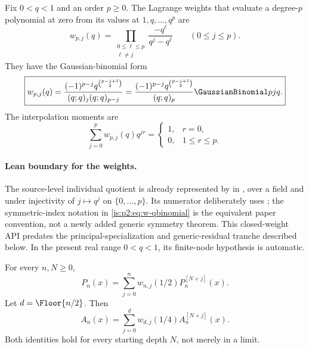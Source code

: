 Fix $0<q<1$ and an order $p\ge0$.  The Lagrange weights that evaluate a degree-$p$ polynomial at
zero from its values at $1,q,\ldots,q^p$ are
\begin{equation}
 w_{p,j}(q)
 =\prod_{\substack{0\le\ell\le p\\\ell\ne j}}
 \frac{-q^\ell}{q^j-q^\ell}
 \qquad(0\le j\le p).
 \label{is:p2:eq:w-Lagrange}
\end{equation}
They have the Gaussian-binomial form
\begin{equation}
 \boxed{
 w_{p,j}(q)
 =\frac{(-1)^{p-j}q^{\binom{p-j+1}{2}}}
 {(q;q)_j(q;q)_{p-j}}
 =\frac{(-1)^{p-j}q^{\binom{p-j+1}{2}}}{(q;q)_p}
 \GaussianBinomial pj q.
 }
 \label{is:p2:eq:w-qbinomial}
\end{equation}
The interpolation moments are
\begin{equation}
 \sum_{j=0}^{p}w_{p,j}(q)q^{jr}
 =\begin{cases}
 1,&r=0,\\
 0,&1\le r\le p.
 \end{cases}
 \label{is:p2:eq:w-annihilation}
\end{equation}

\paragraph{Lean boundary for the weights.}
The source-level individual quotient is already represented by
 in
, over a field and under injectivity of
\(j\mapsto q^j\) on \(\{0,\ldots,p\}\).  Its numerator deliberately uses
; the symmetric-index notation in
\eqref{is:p2:eq:w-qbinomial} is the equivalent paper convention, not a newly added
generic symmetry theorem.  This closed-weight API predates the
principal-specialization and generic-residual tranche described below.  In the
present real range \(0<q<1\), its finite-node hypothesis is automatic.

\begin{theorem}
\label{is:p2:thm:exact-recovery}
For every $n,N\ge0$,
\begin{equation}
 \boxed{
 P_n(x)=\sum_{j=0}^{n}w_{n,j}(1/2)P_n^{[N+j]}(x).
 }
 \label{is:p2:eq:P-exact-recovery}
\end{equation}
Let $d=\Floor{n/2}$.  Then
\begin{equation}
 \boxed{
 A_n(x)=\sum_{j=0}^{d}w_{d,j}(1/4)A_n^{[N+j]}(x).
 }
 \label{is:p2:eq:A-exact-recovery}
\end{equation}
Both identities hold for every starting depth $N$, not merely in a limit.
\end{theorem}

